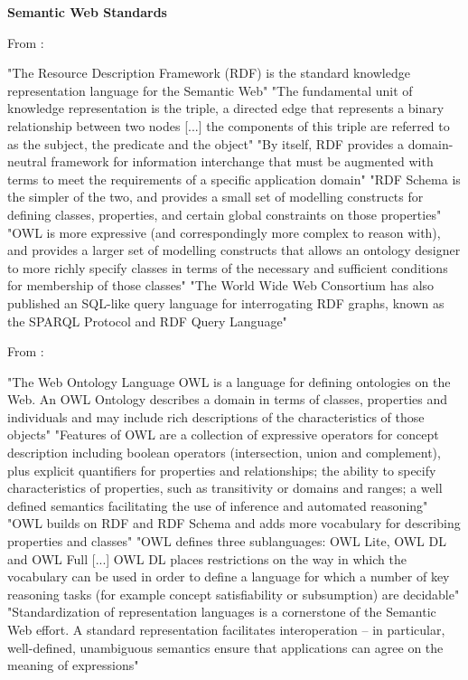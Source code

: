 \textbf{Semantic Web Standards}

From \parencite{gibbins2009resource_description_framework_rdf}:

"The Resource Description Framework (RDF) is the standard knowledge representation language for the Semantic Web"
"The fundamental unit of knowledge representation is the triple, a directed edge that represents a binary relationship between two nodes [...] the components of this triple are referred to as the subject, the predicate and the object"
"By itself, RDF provides a domain-neutral framework for information interchange that must be augmented with terms to meet the requirements of a specific application domain"
"RDF Schema is the simpler of the two, and provides a small set of modelling constructs for defining classes, properties, and certain global constraints on those properties"
"OWL is more expressive (and correspondingly more complex to reason with), and provides a larger set of modelling constructs that allows an ontology designer to more richly specify classes in terms of the necessary and sufficient conditions for membership of those classes"
"The World Wide Web Consortium has also published an SQL-like query language for interrogating RDF graphs, known as the SPARQL Protocol and RDF Query Language"


From \parencite{bechhofer2009owl_web_ontology_language}:

"The Web Ontology Language OWL is a language for defining ontologies on the Web. An OWL Ontology describes a domain in terms of classes, properties and individuals and may include rich descriptions of the characteristics of those objects"
"Features of OWL are a collection of expressive operators for concept description including boolean operators (intersection, union and complement), plus explicit quantifiers for properties and relationships; the ability to specify characteristics of properties, such as transitivity or domains and ranges; a well defined semantics facilitating the use of inference and automated reasoning"
"OWL builds on RDF and RDF Schema and adds more vocabulary for describing properties and classes"
"OWL defines three sublanguages: OWL Lite, OWL DL and OWL Full [...] OWL DL places restrictions on the way in which the vocabulary can be used in order to define a language for which a number of key reasoning tasks (for example concept satisfiability or subsumption) are decidable"
"Standardization of representation languages is a cornerstone of the Semantic Web effort. A standard representation facilitates interoperation – in particular, well-defined, unambiguous semantics ensure that applications can agree on the meaning of expressions"

